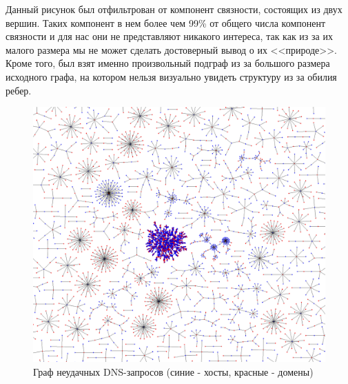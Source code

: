 \documentclass[a4paper,14pt]{extreport} %
\begin{document}
Данный рисунок был отфильтрован от компонент связности, состоящих из двух вершин. Таких компонент в нем более чем 99\% от общего числа компонент связности и для нас они не представляют никакого интереса, так как из за их малого размера мы не может сделать достоверный вывод о их <<природе>>. Кроме того, был взят именно произвольный подграф из за большого размера исходного графа, на котором нельзя визуально увидеть структуру из за обилия ребер.
\\
\begin{figure}[H]
	\center
	\includegraphics[width=0.9\linewidth]{fail-graph.png}
	\caption{Граф неудачных DNS-запросов (синие - хосты, красные - домены)}
			
	\label{fig:subim1}
\end{figure}
	
\end{document}
